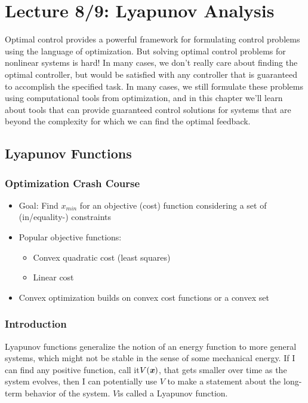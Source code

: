 \chapter{Lecture 8/9: Lyapunov Analysis}
Optimal control provides a powerful framework for formulating control problems using the language of optimization. But solving optimal control problems for nonlinear systems is hard! In many cases, we don't really care about finding the optimal controller, but would be satisfied with any controller that is guaranteed to accomplish the specified task. In many cases, we still formulate these problems using computational tools from optimization, and in this chapter we'll learn about tools that can provide guaranteed control solutions for systems that are beyond the complexity for which we can find the optimal feedback.


\section{Lyapunov Functions}
\subsection{Optimization Crash Course}
\begin{itemize}
\item Goal: Find $x_{min}$ for an objective (cost) function considering a set of (in/equality-) constraints
\item Popular objective functions:
\begin{itemize}
\item Convex quadratic cost (least squares)
\item Linear cost
\end{itemize}
\item Convex optimization builds on convex cost functions or a convex set
\end{itemize}

\subsection{Introduction}
Lyapunov functions generalize the notion of an energy function to more general systems, which might not be stable in the sense of some mechanical energy. If I can find any positive function, call it$V(\bm{\mathit{x}})$, that gets smaller over time as the system evolves, then I can potentially use $V$ to make a statement about the long-term behavior of the system. $V$is called a Lyapunov function. 


